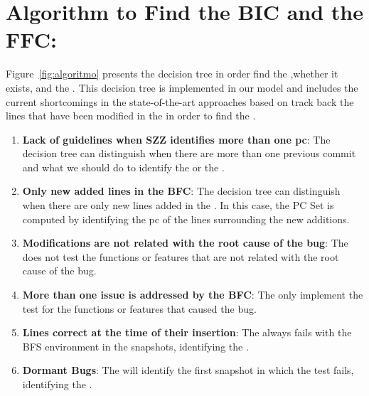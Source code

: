 \documentclass[a4paper, 12pt]{book}
\begin{document}
\section{Algorithm to Find the BIC and the FFC:}
Figure~\ref{fig:algoritmo} presents the decision tree in order find the \BIC ,whether it exists, and the \FFC. This decision tree is implemented in our model and includes the current shortcomings in the state-of-the-art approaches based on track back the lines that have been modified in the \BFC in order to find the \BIC.

 \begin{enumerate}
	\item {\textbf{Lack of guidelines when SZZ identifies more than one pc}}: The decision tree can distinguish when there are more than one previous commit and what we should do to identify the \BIC or the \FFC.
	\item {\textbf{Only new added lines in the BFC}}: The decision tree can distinguish when there are only new lines added in the \BFC. In this case, the PC Set is computed by identifying the pc of the lines surrounding the new additions. 
	\item {\textbf{Modifications are not related with the root cause of the bug}}: The \TSB does not test the functions or features that are not related with the root cause of the bug.
	\item{\textbf{ More than one issue is addressed by the BFC}}: The \TSB only implement the test for the functions or features that caused the bug.
	\item {\textbf{Lines correct at the time of their insertion}}: The \TSB always fails with the BFS environment in the snapshots, identifying the \FFC.
	\item {\textbf{Dormant Bugs}}: The \TSB will identify the first snapshot in which the test fails, identifying the \BIC.

\end{enumerate}
\end{document}

